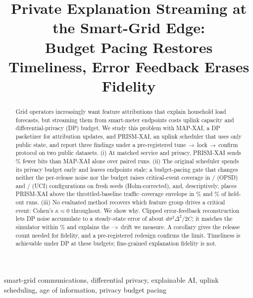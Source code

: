 \documentclass[conference]{IEEEtran}
\newcommand{\method}{PRISM-XAI}
\newcommand{\mapxai}{MAP-XAI}
\begin{document}
\title{Private Explanation Streaming at the Smart-Grid Edge:\\
Budget Pacing Restores Timeliness, Error Feedback Erases Fidelity}

\author{
}

\maketitle

\begin{abstract}
Grid operators increasingly want feature attributions that explain household
load forecasts, but streaming them from smart-meter endpoints costs uplink
capacity and differential-privacy (DP) budget. We study this problem with
\mapxai{}, a DP packetizer for attribution updates, and \method{}, an uplink
scheduler that uses only public state, and report three findings under a
pre-registered tune\,$\rightarrow$\,lock\,$\rightarrow$\,confirm protocol on two
public datasets. (i) At matched service and privacy, \method{} sends
\mapTrafficRel\% fewer bits than \mapxai{} alone over \mapPairs{} paired runs.
(ii) The original scheduler spends its privacy budget early and leaves endpoints
stale; a budget-pacing gate that changes neither the per-release noise nor the
budget raises critical-event coverage in \paceOPSDEvUp/\paceOPSDEvN{} (OPSD) and
\paceUCIEvUp/\paceUCIEvN{} (UCI) configurations on fresh seeds (Holm-corrected),
and, descriptively, places \method{} above the throttled-baseline traffic--coverage envelope in
\frEvOPSDAbove\% and \frEvUCIAbove\% of held-out runs. (iii) No evaluated method
recovers which feature group drives a critical event: Cohen's $\kappa\approx0$
throughout. We show why. Clipped error-feedback reconstruction lets DP noise
accumulate to a steady-state error of about $d\sigma^2\Delta^2/2C$; it matches the
simulator within \propMaxRelErr\% and explains the \diagBlRatioMin--\diagBlRatioMax$\times$ drift we measure.
A corollary gives the release count needed for fidelity, and a pre-registered
redesign confirms the limit. Timeliness is achievable under DP at these
budgets; fine-grained explanation fidelity is not.
\end{abstract}

\begin{IEEEkeywords}
smart-grid communications, differential privacy, explainable AI, uplink
scheduling, age of information, privacy budget pacing
\end{IEEEkeywords}
\end{document}

